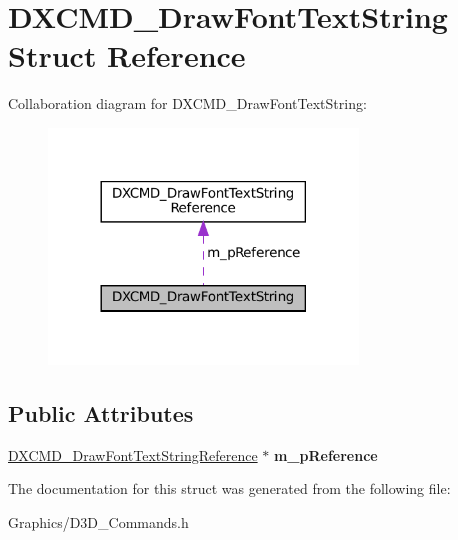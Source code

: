 \hypertarget{structDXCMD__DrawFontTextString}{}\section{D\+X\+C\+M\+D\+\_\+\+Draw\+Font\+Text\+String Struct Reference}
\label{structDXCMD__DrawFontTextString}


Collaboration diagram for D\+X\+C\+M\+D\+\_\+\+Draw\+Font\+Text\+String\+:\nopagebreak
\begin{figure}[H]
\begin{center}
\leavevmode
\includegraphics[width=233pt]{structDXCMD__DrawFontTextString__coll__graph}
\end{center}
\end{figure}
\subsection*{Public Attributes}
\begin{DoxyCompactItemize}
\item 
\mbox{\label{structDXCMD__DrawFontTextString_a0dae70689e090e5eaef1f450abe7dc04}} 
\hyperlink{structDXCMD__DrawFontTextStringReference}{D\+X\+C\+M\+D\+\_\+\+Draw\+Font\+Text\+String\+Reference} $\ast$ {\bfseries m\+\_\+p\+Reference}
\end{DoxyCompactItemize}


The documentation for this struct was generated from the following file\+:\begin{DoxyCompactItemize}
\item 
Graphics/D3\+D\+\_\+\+Commands.\+h\end{DoxyCompactItemize}
